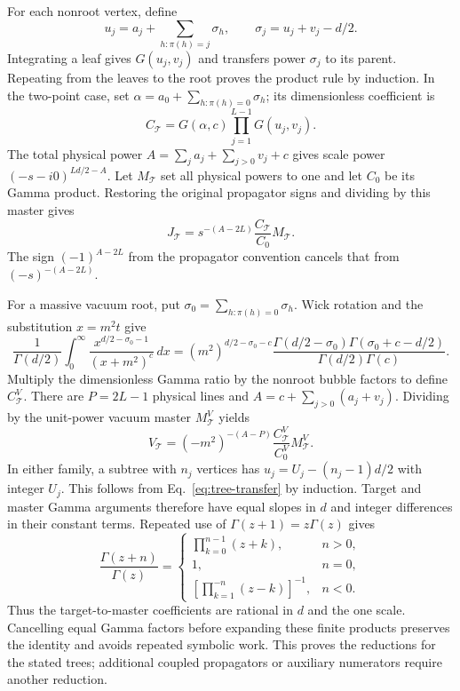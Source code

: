 For each nonroot vertex, define
\begin{equation}
 u_j=a_j+\sum_{h:\pi(h)=j}\sigma_h,\qquad
 \sigma_j=u_j+v_j-d/2.
 \label{eq:tree-transfer}
\end{equation}
Integrating a leaf gives $G(u_j,v_j)$ and transfers power $\sigma_j$ to its parent. Repeating from the leaves to the root proves the product rule by induction. In the two-point case, set $\alpha=a_0+\sum_{h:\pi(h)=0}\sigma_h$; its dimensionless coefficient is
\begin{equation}
 C_{\mathcal T}=G(\alpha,c)\prod_{j=1}^{L-1}G(u_j,v_j).
 \label{eq:tree-coefficient}
\end{equation}
The total physical power $A=\sum_j a_j+\sum_{j>0}v_j+c$ gives scale power $(-s-i0)^{Ld/2-A}$. Let $M_{\mathcal T}$ set all physical powers to one and let $C_0$ be its Gamma product. Restoring the original propagator signs and dividing by this master gives
\begin{equation}
 J_{\mathcal T}=s^{-(A-2L)}\frac{C_{\mathcal T}}{C_0}M_{\mathcal T}.
 \label{eq:tree-ratio}
\end{equation}
The sign $(-1)^{A-2L}$ from the propagator convention cancels that from $(-s)^{-(A-2L)}$.

For a massive vacuum root, put $\sigma_0=\sum_{h:\pi(h)=0}\sigma_h$. Wick rotation and the substitution $x=m^2t$ give
\begin{equation}
 \frac{1}{\Gamma(d/2)}\int_0^\infty
 \frac{x^{d/2-\sigma_0-1}}{(x+m^2)^c}\,dx
 =(m^2)^{d/2-\sigma_0-c}
 \frac{\Gamma(d/2-\sigma_0)\Gamma(\sigma_0+c-d/2)}
 {\Gamma(d/2)\Gamma(c)}.
 \label{eq:tree-vacuum}
\end{equation}
Multiply the dimensionless Gamma ratio by the nonroot bubble factors to define $C_{\mathcal T}^{V}$. There are $P=2L-1$ physical lines and $A=c+\sum_{j>0}(a_j+v_j)$. Dividing by the unit-power vacuum master $M_{\mathcal T}^{V}$ yields
\begin{equation}
 V_{\mathcal T}=(-m^2)^{-(A-P)}
 \frac{C_{\mathcal T}^{V}}{C_0^{V}}M_{\mathcal T}^{V}.
 \label{eq:tree-vacuum-ratio}
\end{equation}
In either family, a subtree with $n_j$ vertices has $u_j=U_j-(n_j-1)d/2$ with integer $U_j$. This follows from Eq.~\eqref{eq:tree-transfer} by induction. Target and master Gamma arguments therefore have equal slopes in $d$ and integer differences in their constant terms. Repeated use of $\Gamma(z+1)=z\Gamma(z)$ gives
\begin{equation}
 \frac{\Gamma(z+n)}{\Gamma(z)}=
 \begin{cases}\prod_{k=0}^{n-1}(z+k),&n>0,\\
 1,&n=0,\\
 [\prod_{k=1}^{-n}(z-k)]^{-1},&n<0.
 \end{cases}
 \label{eq:tree-gamma-ratio}
\end{equation}
Thus the target-to-master coefficients are rational in $d$ and the one scale. Cancelling equal Gamma factors before expanding these finite products preserves the identity and avoids repeated symbolic work. This proves the reductions for the stated trees; additional coupled propagators or auxiliary numerators require another reduction.
